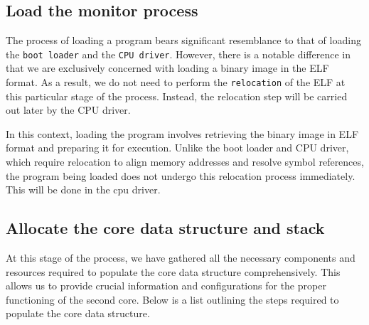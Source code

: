 \subsection{Load the monitor process}

The process of loading a program bears significant resemblance to that of loading the \texttt{boot loader} and the \texttt{CPU driver}. However, there is a notable difference in that we are exclusively concerned with loading a binary image in the ELF format. As a result, we do not need to perform the \texttt{relocation} of the ELF at this particular stage of the process. Instead, the relocation step will be carried out later by the CPU driver.

In this context, loading the program involves retrieving the binary image in ELF format and preparing it for execution. Unlike the boot loader and CPU driver, which require relocation to align memory addresses and resolve symbol references, the program being loaded does not undergo this relocation process immediately. This will be done in the cpu driver.

\subsection{Allocate the core data structure and stack}

At this stage of the process, we have gathered all the necessary components and resources required to populate the core data structure comprehensively. This allows us to provide crucial information and configurations for the proper functioning of the second core. Below is a list outlining the steps required to populate the core data structure.


